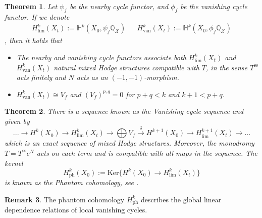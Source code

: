 \documentclass[12pt, letterpaper]{amsart}
\theoremstyle{plain}
\newtheorem{theorem}{Theorem}[section]
\theoremstyle{definition}
\newtheorem{remark}[theorem]{Remark}
\begin{document}
\begin{theorem}
\label{Thm:CycleFunctor}
Let $\psi_f$ be the nearby cycle functor, and 
$\phi_f$ be the vanishing cycle functor. If we denote
\begin{align*}
 H^k_{\mathrm{lim}}(X_t):=\mathbb{H}^k(X_0, \psi_f\mathbb{Q}_{\mathcal{X}})
 &&
 H^k_{\mathrm{van}}(X_t):=\mathbb{H}^k(X_0, \phi_f\mathbb{Q}_{\mathcal{X}})
\end{align*}
, then it holds that 
\begin{itemize}
\item[1.] The nearby and vanishing cycle functors associate both $H^k_{\mathrm{lim}}(X_t)$ and $H^k_{\mathrm{van}}(X_t)$ natural mixed Hodge structures compatible with $T$, in the sense $T^{\mathrm{ss}}$ acts finitely and $N$ acts as an $(-1,-1)$-morphism.
\item[2.] $H^k_{\mathrm{van}}(X_t)\cong V_f$ and  $(V_f)^{p,q} = 0$ for  $ p+q  <k$ and $k+1 < p+q$. 
\end{itemize}
\end{theorem}

\begin{theorem}\label{vcs}
 There is a sequence known as the Vanishing cycle sequence and given by
\begin{equation}
    ...\rightarrow H^k(X_0)\xrightarrow{}{}H^k_{\mathrm{lim}}(X_t)\xrightarrow{}\bigoplus V_f\xrightarrow{\delta}H^{k+1}(X_0)\rightarrow H^{k+1}_{\mathrm{lim}}(X_t)\rightarrow ...
\end{equation}
which is an exact sequence of mixed Hodge structures. Moreover, the monodromy $T=T^{\text{ss}}e^N$ acts on each term and is compatible with all maps in the sequence. The kernel
\begin{equation}
H^k_{\mathrm{ph}}(X_0):=\mathrm{Ker}\{H^k(X_0)\xrightarrow{\mathrm{}}{}H^k_{\mathrm{lim}}(X_t)\}
\end{equation}
is known as the Phantom cohomology, see \cite{KL20}.
\end{theorem}
\begin{remark}
The phantom cohomology $H^k_{\mathrm{ph}}$ describes the global linear dependence relations of local vanishing cycles.
\end{remark}
\end{document}
